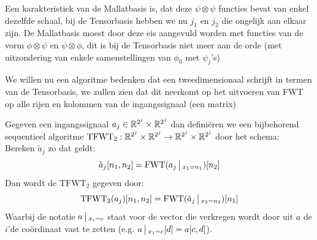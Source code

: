 Een karakteristiek van de Mallatbasis is, dat deze $\psi \otimes \psi$ functies bevat van enkel dezelfde schaal,
bij de Tensorbasis hebben we nu $j_1$ en $j_2$ die ongelijk aan elkaar zijn.
De Mallatbasis moest door deze eis aangevuld worden met functies van de vorm $\phi\otimes\psi$ en $\psi\otimes\phi$,
dit is bij de Tensorbasis niet meer aan de orde (met uitzondering van enkele samenstellingen van $\phi_0$ met $\psi_j$'s)

We willen nu een algoritme bedenken dat een tweedimensionaal schrijft in termen van de Tensorbasis,
we zullen zien dat dit neerkomt op het uitvoeren van FWT op alle rijen en kolommen van de ingangssignaal (een matrix)

\begin{algo}
Gegeven een ingangssignaal $a_j\in\mathbb{R}^{2^j}\times\mathbb{R}^{2^j}$ dan defini\"eren we een bijbehorend sequentieel algoritme 
$\mathrm{TFWT}_2:\mathbb{R}^{2^j}\times\mathbb{R}^{2^j}\to \mathbb{R}^{2^j}\times\mathbb{R}^{2^j}$ door het schema:\\
Bereken $\tilde a_j$ zo dat geldt:
\[
\tilde a_j[n_1,n_2] = \mathrm{FWT}(a_j\,\big|\,_{x_1=n_1})[n_2] 
\]
Dan wordt de $\mathrm{TFWT}_2$ gegeven door:
\[
\mathrm{TFWT}_2(a_j)[n_1,n_2] = \mathrm{FWT}(\tilde a_j\,\big|\,_{x_2=n_2})[n_1]
\] 
Waarbij de notatie $a\,\big|\,_{x_i=c}$ staat voor de vector die verkregen wordt door uit $a$
de $i$'de co\"ordinaat vast te zetten (e.g. $a\,\big|\,_{x_1=c}[d] = a[c,d]$).
\end{algo}

